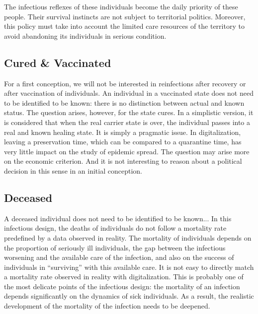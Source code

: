 The infectious reflexes of these individuals become the daily priority of these people. Their survival instincts are not subject to territorial politics. Moreover, this policy must take into account the limited care resources of the territory to avoid abandoning its individuals in serious condition.\\

\subsection{Cured \& Vaccinated}

For a first conception, we will not be interested in reinfections after recovery or after vaccination of individuals. An individual in a vaccinated state does not need to be identified to be known: there is no distinction between actual and known status. The question arises, however, for the state cures. In a simplistic version, it is considered that when the real carrier state is over, the individual passes into a real and known healing state. It is simply a pragmatic issue. In digitalization, leaving a preservation time, which can be compared to a quarantine time, has very little impact on the study of epidemic spread. The question may arise more on the economic criterion. And it is not interesting to reason about a political decision in this sense in an initial conception.\\

\subsection{Deceased}

A deceased individual does not need to be identified to be known... In this infectious design, the deaths of individuals do not follow a mortality rate predefined by a data observed in reality. The mortality of individuals depends on the proportion of seriously ill individuals, the gap between the infectious worsening and the available care of the infection, and also on the success of individuals in ``surviving'' with this available care. It is not easy to directly match a mortality rate observed in reality with digitalization. This is probably one of the most delicate points of the infectious design: the mortality of an infection depends significantly on the dynamics of sick individuals. As a result, the realistic development of the mortality of the infection needs to be deepened.\\

\newpage


